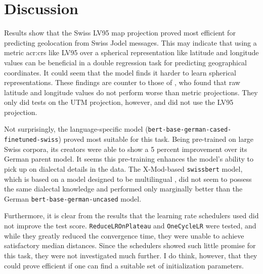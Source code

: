 \section{Discussion}
\label{sec:Discussion}

\begin{comment}
It is important to include a discussion, which describes what you have learned so far, the merits of the work as well as its limitations.
It can be a separate section or it can appear together with the results or be part of the conclusion).
When evaluating your results, avoid drawing grand conclusions, beyond those that your results can in fact support.
Further, although you may have designed your experiments to answer certain questions,
the results may raise other questions in the eyes of the reader.
It is important that you study the graphs/tables to look for unusual features/entries, and discuss these as well as the main findings.
In particular, carry out an error analysis: b went wrong and why?
\end{comment}

Results show that the Swiss LV95 map projection proved most efficient for predicting geolocation from Swiss Jodel messages. This may indicate that using a metric \gls{acr:crs} like LV95 over a spherical representation like latitude and longitude values can be beneficial in a double regression task for predicting geographical coordinates. It could seem that the model finds it harder to learn spherical representations. These findings are counter to those of \cite[5]{scherrerHeLjuVarDial20202020}, who found that raw latitude and longitude values do not perform worse than metric projections. They only did tests on the UTM projection, however, and did not use the LV95 projection.

Not surprisingly, the language-specific model (\texttt{bert-base-german-cased-finetuned-swiss}) proved most suitable for this task. Being pre-trained on large Swiss corpora, its creators were able to show a 5 percent improvement over its German parent model. It seems this pre-training enhances the model's ability to pick up on dialectal details in the data. The X-Mod-based \texttt{swissbert} model, which is based on a model designed to be multilingual \citep{pfeifferLiftingCurseMultilinguality2022}, did not seem to possess the same dialectal knowledge and performed only marginally better than the German \texttt{bert-base-german-uncased} model.

Furthermore, it is clear from the results that the learning rate schedulers used did not improve the test score. \texttt{ReduceLROnPlateau} and \texttt{OneCycleLR} were tested, and while they greatly reduced the convergence time, they were unable to achieve satisfactory median distances. Since the schedulers showed such little promise for this task, they were not investigated much further. I do think, however, that they could prove efficient if one can find a suitable set of initialization parameters.

